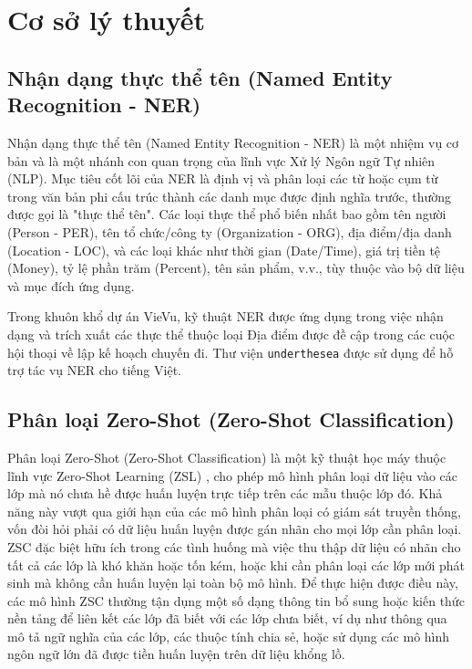 \section{Cơ sở lý thuyết}
\label{sec:fundamental_knowledge}
\subsection{Nhận dạng thực thể tên (Named Entity Recognition - NER)}

Nhận dạng thực thể tên (Named Entity Recognition - NER) là một nhiệm vụ cơ bản và là một nhánh con quan trọng của lĩnh vực Xử lý Ngôn ngữ Tự nhiên (NLP). Mục tiêu cốt lõi của NER là định vị và phân loại các từ hoặc cụm từ trong văn bản phi cấu trúc thành các danh mục được định nghĩa trước, thường được gọi là "thực thể tên". Các loại thực thể phổ biến nhất bao gồm tên người (Person - PER), tên tổ chức/công ty (Organization - ORG), địa điểm/địa danh (Location - LOC), và các loại khác như thời gian (Date/Time), giá trị tiền tệ (Money), tỷ lệ phần trăm (Percent), tên sản phẩm, v.v., tùy thuộc vào bộ dữ liệu và mục đích ứng dụng.

Trong khuôn khổ dự án VieVu, kỹ thuật NER được ứng dụng trong việc nhận dạng và trích xuất các thực thể thuộc loại Địa điểm được đề cập trong các cuộc hội thoại về lập kế hoạch chuyến đi. Thư viện \texttt{underthesea} \cite{underthesea_lib} được sử dụng để hỗ trợ tác vụ NER cho tiếng Việt.

\subsection{Phân loại Zero-Shot (Zero-Shot Classification)}

Phân loại Zero-Shot (Zero-Shot Classification) là một kỹ thuật học máy thuộc lĩnh vực Zero-Shot Learning (ZSL) \cite{zsl_concept}, cho phép mô hình phân loại dữ liệu vào các lớp mà nó chưa hề được huấn luyện trực tiếp trên các mẫu thuộc lớp đó. Khả năng này vượt qua giới hạn của các mô hình phân loại có giám sát truyền thống, vốn đòi hỏi phải có dữ liệu huấn luyện được gán nhãn cho mọi lớp cần phân loại. ZSC đặc biệt hữu ích trong các tình huống mà việc thu thập dữ liệu có nhãn cho tất cả các lớp là khó khăn hoặc tốn kém, hoặc khi cần phân loại các lớp mới phát sinh mà không cần huấn luyện lại toàn bộ mô hình. Để thực hiện được điều này, các mô hình ZSC thường tận dụng một số dạng thông tin bổ sung hoặc kiến thức nền tảng để liên kết các lớp đã biết với các lớp chưa biết, ví dụ như thông qua mô tả ngữ nghĩa của các lớp, các thuộc tính chia sẻ, hoặc sử dụng các mô hình ngôn ngữ lớn đã được tiền huấn luyện trên dữ liệu khổng lồ.

